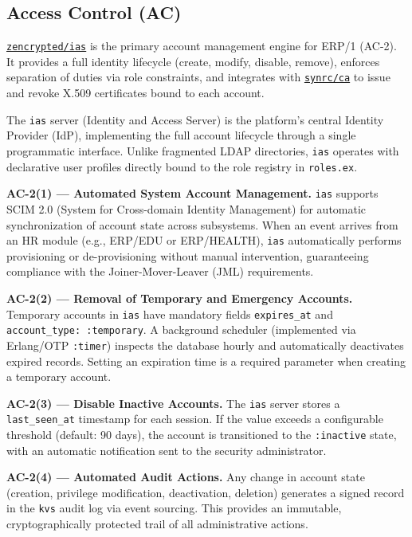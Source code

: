 \documentclass{article}
\begin{document}
\subsection{Access Control (AC)}
\href{https://github.com/zencrypted/ias}{\texttt{zencrypted/ias}} is the primary account management engine for ERP/1 (AC-2). It provides a full identity lifecycle (create, modify, disable, remove), enforces separation of duties via role constraints, and integrates with \href{https://github.com/synrc/ca}{\texttt{synrc/ca}} to issue and revoke X.509 certificates bound to each account.

The \texttt{ias} server (Identity and Access Server) is the platform's central Identity Provider (IdP), implementing the full account lifecycle through a single programmatic interface. Unlike fragmented LDAP directories, \texttt{ias} operates with declarative user profiles directly bound to the role registry in \texttt{roles.ex}.

\textbf{AC-2(1) --- Automated System Account Management.}
\texttt{ias} supports SCIM 2.0 (System for Cross-domain Identity Management) for automatic synchronization of account state across subsystems. When an event arrives from an HR module (e.g., ERP/EDU or ERP/HEALTH), \texttt{ias} automatically performs provisioning or de-provisioning without manual intervention, guaranteeing compliance with the Joiner-Mover-Leaver (JML) requirements.

\textbf{AC-2(2) --- Removal of Temporary and Emergency Accounts.}
Temporary accounts in \texttt{ias} have mandatory fields \texttt{expires\_at} and \texttt{account\_type: :temporary}. A background scheduler (implemented via Erlang/OTP \texttt{:timer}) inspects the database hourly and automatically deactivates expired records. Setting an expiration time is a required parameter when creating a temporary account.

\textbf{AC-2(3) --- Disable Inactive Accounts.}
The \texttt{ias} server stores a \texttt{last\_seen\_at} timestamp for each session. If the value exceeds a configurable threshold (default: 90 days), the account is transitioned to the \texttt{:inactive} state, with an automatic notification sent to the security administrator.

\textbf{AC-2(4) --- Automated Audit Actions.}
Any change in account state (creation, privilege modification, deactivation, deletion) generates a signed record in the \texttt{kvs} audit log via event sourcing. This provides an immutable, cryptographically protected trail of all administrative actions.
\end{document}
